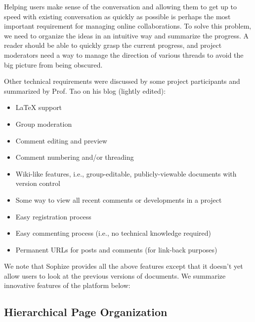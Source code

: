 \documentclass[a4paper]{article}
\begin{document}
Helping users make sense of the conversation and allowing them to get up to speed with existing conversation as quickly as possible is perhaps the most important requirement for managing online collaborations. To solve this problem, we need to organize the ideas in an intuitive way  and summarize the progress. A reader should be able to quickly grasp the current progress, and project moderators need a way to manage the direction of various threads to avoid the big picture from being obscured.


Other technical requirements were discussed by some project participants and summarized by Prof. Tao on his blog\cite{whats_new_2009} (lightly edited):

\begin{itemize}

  \item LaTeX support

  \item Group moderation

  \item Comment editing and preview

  \item Comment numbering and/or threading

  \item Wiki-like features, i.e., group-editable, publicly-viewable documents with version control

  \item Some way to view all recent comments or developments in a project

  \item Easy registration process

  \item Easy commenting process (i.e., no technical knowledge required)

  \item Permanent URLs for posts and comments (for link-back purposes)

\end{itemize}


We note that Sophize provides all the above features except that it doesn't yet allow users to look at the previous versions of documents. We summarize innovative features of the platform below:


\subsection{Hierarchical Page Organization}
\end{document}
